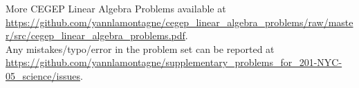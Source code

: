 More CEGEP Linear Algebra Problems available at \url{https://github.com/yannlamontagne/cegep_linear_algebra_problems/raw/master/src/cegep_linear_algebra_problems.pdf}.\\

Any mistakes/typo/error in the problem set can be reported at \url{https://github.com/yannlamontagne/supplementary_problems_for_201-NYC-05_science/issues}.
